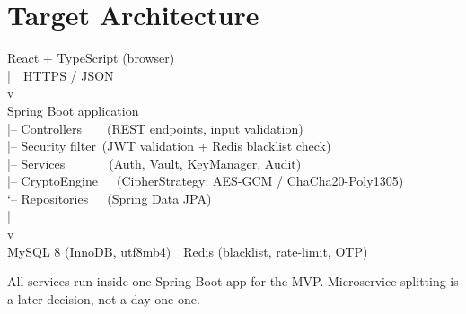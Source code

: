 \documentclass[11pt,a4paper]{article}
\begin{document}
\section{Target Architecture}
\begin{tcolorbox}[colback=boxbg,colframe=gray!50]
\ttfamily\small
React + TypeScript (browser)\\
\hphantom{xx}|\ \ HTTPS / JSON\\
\hphantom{xx}v\\
Spring Boot application\\
\hphantom{xx}|-- Controllers\ \ \ \ (REST endpoints, input validation)\\
\hphantom{xx}|-- Security filter\ (JWT validation + Redis blacklist check)\\
\hphantom{xx}|-- Services\ \ \ \ \ \ \ (Auth, Vault, KeyManager, Audit)\\
\hphantom{xx}|-- CryptoEngine\ \ \ (CipherStrategy: AES-GCM / ChaCha20-Poly1305)\\
\hphantom{xx}`-- Repositories\ \ \ (Spring Data JPA)\\
\hphantom{xx}|\\
\hphantom{xx}v\\
MySQL 8 (InnoDB, utf8mb4)\ <-->\ Redis (blacklist, rate-limit, OTP)
\end{tcolorbox}
All services run inside one Spring Boot app for the MVP. Microservice splitting is a later
decision, not a day-one one.

\end{document}
